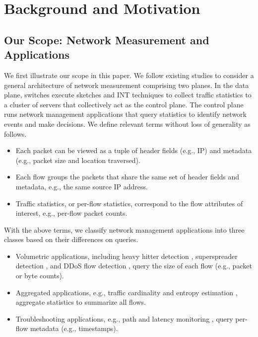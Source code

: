 \section{Background and Motivation}\label{background}

\subsection{Our Scope: Network Measurement and Applications}

We first illustrate our scope in this paper. We follow existing studies \cite{namkung2022sketchlib,anup2022hetero,liu2016one} to consider a general architecture of network measurement comprising two planes. In the data plane, switches execute sketches and INT techniques to collect traffic statistics to a cluster of servers that collectively act as the control plane. The control plane runs network management applications that query statistics to identify network events and make decisions. We define relevant terms without loss of generality as follows.

\begin{itemize}[leftmargin=*]
%
    \item Each packet can be viewed as a tuple of header fields (e.g., IP) and metadata (e.g., packet size and location traversed).
%
    \item Each flow groups the packets that share the same set of header fields and metadata, e.g., the same source IP address. 
%
    \item Traffic statistics, or per-flow statistics, correspond to the flow attributes of interest, e.g., per-flow packet counts. 
%
\end{itemize}

\noindent With the above terms, we classify network management applications into three classes based on their differences on queries.

\begin{itemize}[leftmargin=*]
%
    \item Volumetric applications, including heavy hitter detection \cite{huang2017sketchvisor}, superspreader detection \cite{tang2019mv}, and DDoS flow detection \cite{liu2021jaqen}, query the size of each flow (e.g., packet or byte counts). 
%
    \item Aggregated applications, e.g., traffic cardinality and entropy estimation \cite{liu2016one}, aggregate statistics to summarize all flows. 
%
    \item Troubleshooting applications, e.g., path and latency monitoring \cite{ben2020pint,sheng2021deltaint}, query per-flow metadata (e.g., timestamps).
%
\end{itemize}

